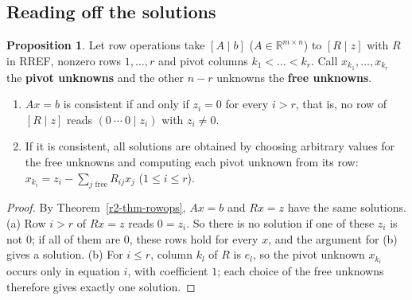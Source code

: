\documentclass[12pt]{article}
\newcommand{\R}{\mathbb R}
\theoremstyle{definition}
\newtheorem{proposition}[theorem]{Proposition}
\begin{document}
\subsection*{Reading off the solutions}

\begin{proposition}\label{r2-prop-solutions}
Let row operations take \([A\mid b]\) (\(A\in\R^{m\times n}\)) to \([R\mid z]\) with \(R\) in
RREF, nonzero rows \(1,\dots,r\) and pivot columns \(k_1<\dots<k_r\). Call \(x_{k_1},\dots,x_{k_r}\)
the \textbf{pivot unknowns} and the other \(n-r\) unknowns the \textbf{free unknowns}.
\begin{enumerate}
\item \(Ax=b\) is consistent if and only if \(z_i=0\) for every \(i>r\), that is, no row of
\([R\mid z]\) reads \((0\ \cdots\ 0\mid z_i)\) with \(z_i\ne0\).
\item If it is consistent, all solutions are obtained by choosing arbitrary values for the free
unknowns and computing each pivot unknown from its row:
\(x_{k_i}=z_i-\sum_{j\text{ free}}R_{ij}x_j\) (\(1\leqslant i\leqslant r\)).
\end{enumerate}
\end{proposition}
\begin{proof}
By Theorem~\ref{r2-thm-rowops}, \(Ax=b\) and \(Rx=z\) have the same solutions. (a) Row
\(i>r\) of \(Rx=z\) reads \(0=z_i\). So there is no solution if one of these \(z_i\) is not \(0\);
if all of them are \(0\), these rows hold for every \(x\), and the argument for (b) gives a
solution. (b) For \(i\leqslant r\), column \(k_l\) of \(R\) is
\(e_l\), so the pivot unknown \(x_{k_i}\) occurs only in equation \(i\), with coefficient \(1\);
each choice of the free unknowns therefore gives exactly one solution.
\end{proof}
\end{document}
